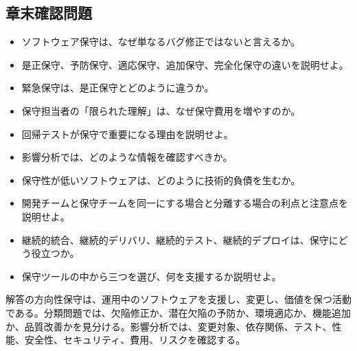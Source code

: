 \subsection{章末確認問題}
\begin{itemize}
\item ソフトウェア保守は、なぜ単なるバグ修正ではないと言えるか。
\item 是正保守、予防保守、適応保守、追加保守、完全化保守の違いを説明せよ。
\item 緊急保守は、是正保守とどのように違うか。
\item 保守担当者の「限られた理解」は、なぜ保守費用を増やすのか。
\item 回帰テストが保守で重要になる理由を説明せよ。
\item 影響分析では、どのような情報を確認すべきか。
\item 保守性が低いソフトウェアは、どのように技術的負債を生むか。
\item 開発チームと保守チームを同一にする場合と分離する場合の利点と注意点を説明せよ。
\item 継続的統合、継続的デリバリ、継続的テスト、継続的デプロイは、保守にどう役立つか。
\item 保守ツールの中から三つを選び、何を支援するか説明せよ。
\end{itemize}
\begin{pointbox}{解答の方向性}保守は、運用中のソフトウェアを支援し、変更し、価値を保つ活動である。分類問題では、欠陥修正か、潜在欠陥の予防か、環境適応か、機能追加か、品質改善かを見分ける。影響分析では、変更対象、依存関係、テスト、性能、安全性、セキュリティ、費用、リスクを確認する。\end{pointbox}
